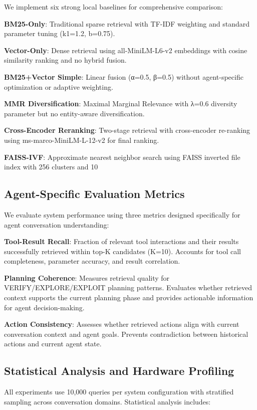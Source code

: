 \documentclass[letterpaper]{article}
\begin{document}
We implement six strong local baselines for comprehensive comparison:

\textbf{BM25-Only}: Traditional sparse retrieval with TF-IDF weighting and standard parameter tuning (k1=1.2, b=0.75).

\textbf{Vector-Only}: Dense retrieval using all-MiniLM-L6-v2 embeddings with cosine similarity ranking and no hybrid fusion.

\textbf{BM25+Vector Simple}: Linear fusion (α=0.5, β=0.5) without agent-specific optimization or adaptive weighting.

\textbf{MMR Diversification}: Maximal Marginal Relevance with λ=0.6 diversity parameter but no entity-aware diversification.

\textbf{Cross-Encoder Reranking}: Two-stage retrieval with cross-encoder re-ranking using ms-marco-MiniLM-L-12-v2 for final ranking.

\textbf{FAISS-IVF}: Approximate nearest neighbor search using FAISS inverted file index with 256 clusters and 10%

\subsection{Agent-Specific Evaluation Metrics}

We evaluate system performance using three metrics designed specifically for agent conversation understanding:

\textbf{Tool-Result Recall}: Fraction of relevant tool interactions and their results successfully retrieved within top-K candidates (K=10). Accounts for tool call completeness, parameter accuracy, and result correlation.

\textbf{Planning Coherence}: Measures retrieval quality for VERIFY/EXPLORE/EXPLOIT planning patterns. Evaluates whether retrieved context supports the current planning phase and provides actionable information for agent decision-making.

\textbf{Action Consistency}: Assesses whether retrieved actions align with current conversation context and agent goals. Prevents contradiction between historical actions and current agent state.

\subsection{Statistical Analysis and Hardware Profiling}

All experiments use 10,000 queries per system configuration with stratified sampling across conversation domains. Statistical analysis includes:
\end{document}
